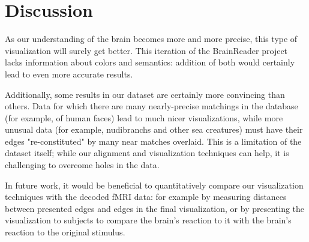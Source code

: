 
\section{Discussion}

As our understanding of the brain becomes more and more precise, this type of visualization will surely get better.  This iteration of the BrainReader project lacks information about colors and semantics: addition of both would certainly lead to even more accurate results.

Additionally, some results in our dataset are certainly more convincing than others.  Data for which there are many nearly-precise matchings in the database (for example, of human faces) lead to much nicer visualizations, while more unusual data (for example, nudibranchs and other sea creatures) must have their edges "re-constituted" by many near matches overlaid.  This is a limitation of the dataset itself; while our alignment and visualization techniques can help, it is challenging to overcome holes in the data.  

In future work, it would be beneficial to quantitatively compare our visualization techniques with the decoded fMRI data: for example by measuring distances between presented edges and edges in the final visualization, or by presenting the visualization to subjects to compare the brain's reaction to it with the brain's reaction to the original stimulus.